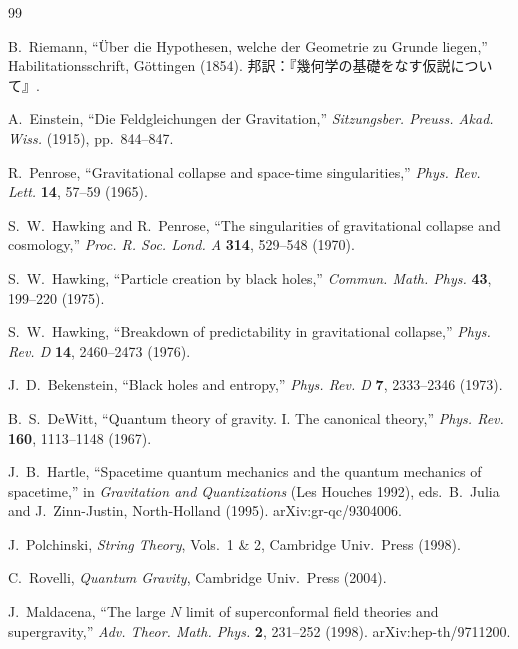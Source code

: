 \documentclass[12pt,a4paper]{ltjsarticle}
\theoremstyle{definition}
\begin{document}
\newpage
\begin{thebibliography}{99}

B.~Riemann, ``\"{U}ber die Hypothesen, welche der Geometrie zu Grunde liegen,'' Habilitationsschrift, G\"{o}ttingen (1854). 邦訳：『幾何学の基礎をなす仮説について』.

A.~Einstein, ``Die Feldgleichungen der Gravitation,'' \textit{Sitzungsber. Preuss. Akad. Wiss.} (1915), pp.~844--847.

R.~Penrose, ``Gravitational collapse and space-time singularities,'' \textit{Phys. Rev. Lett.} \textbf{14}, 57--59 (1965).

S.~W.~Hawking and R.~Penrose, ``The singularities of gravitational collapse and cosmology,'' \textit{Proc. R. Soc. Lond. A} \textbf{314}, 529--548 (1970).

S.~W.~Hawking, ``Particle creation by black holes,'' \textit{Commun. Math. Phys.} \textbf{43}, 199--220 (1975).

S.~W.~Hawking, ``Breakdown of predictability in gravitational collapse,'' \textit{Phys. Rev. D} \textbf{14}, 2460--2473 (1976).

J.~D.~Bekenstein, ``Black holes and entropy,'' \textit{Phys. Rev. D} \textbf{7}, 2333--2346 (1973).

B.~S.~DeWitt, ``Quantum theory of gravity. I. The canonical theory,'' \textit{Phys. Rev.} \textbf{160}, 1113--1148 (1967).

J.~B.~Hartle, ``Spacetime quantum mechanics and the quantum mechanics of spacetime,'' in \textit{Gravitation and Quantizations} (Les Houches 1992), eds.~B.~Julia and J.~Zinn-Justin, North-Holland (1995). arXiv:gr-qc/9304006.

J.~Polchinski, \textit{String Theory}, Vols.~1 \& 2, Cambridge Univ.~Press (1998).

C.~Rovelli, \textit{Quantum Gravity}, Cambridge Univ.~Press (2004).

J.~Maldacena, ``The large $N$ limit of superconformal field theories and supergravity,'' \textit{Adv. Theor. Math. Phys.} \textbf{2}, 231--252 (1998). arXiv:hep-th/9711200.


\end{thebibliography}
\end{document}
